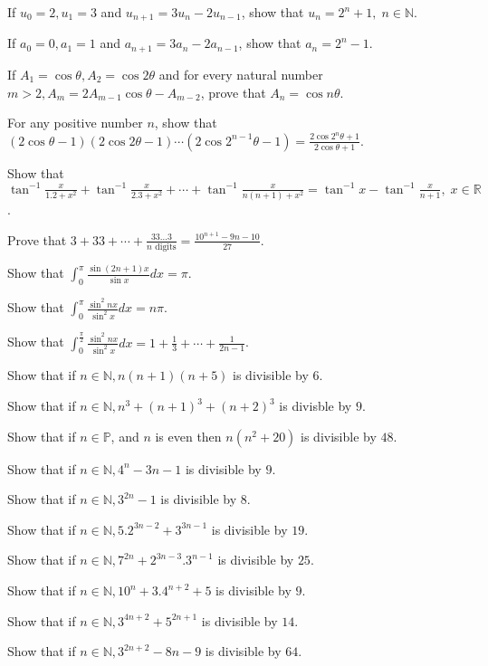 \item If $u_0 = 2, u_1 = 3$ and $u_{n + 1} = 3u_n - 2u_{n - 1}$, show that $u_n = 2^n + 1,\;n\in \mathbb{N}$.
\item If $a_0 = 0, a_1 = 1$ and $a_{n + 1} = 3a_n - 2a_{n - 1}$, show that $a_n = 2^n - 1$.
\item If $A_1 = \cos\theta, A_2 = \cos2\theta$ and for every natural number $m > 2, A_m = 2A_{m-1}\cos\theta - A_{m - 2}$, prove
  that $A_n = \cos n\theta$.
\item For any positive number $n$, show that $(2\cos\theta - 1)(2\cos2\theta - 1)\cdots(2\cos2^{n - 1}\theta - 1) =
  \frac{2\cos2^n\theta + 1}{2\cos\theta + 1}$.
\item Show that $\tan^{-1}\frac{x}{1.2 + x^2} + \tan^{-1}\frac{x}{2.3 + x^2} + \cdots + \tan^{-1}\frac{x}{n(n + 1) + x^2} =
  \tan^{-1}x - \tan^{-1}\frac{x}{n + 1},\;x\in \mathbb{R}$.
\item Prove that $3 + 33 + \cdots + \frac{33\ldots3}{n\text{~digits}} = \frac{10^{n + 1} - 9n - 10}{27}$.
\item Show that $\displaystyle\int_{0}^\pi\frac{\sin(2n + 1)x}{\sin x}dx = \pi$.
\item Show that $\displaystyle\int_{0}^\pi\frac{\sin^2nx}{\sin^2x}dx = n\pi$.
\item Show that $\displaystyle\int_{0}^{\frac{\pi}{2}}\frac{\sin^2nx}{\sin^2x}dx = 1 + \frac{1}{3} + \cdots + \frac{1}{2n - 1}$.
\item Show that if $n\in\mathbb{N}, n(n + 1)(n + 5)$ is divisible by $6$.
\item Show that if $n\in\mathbb{N}, n^3 + (n + 1)^3 + (n + 2)^3$ is divisble by $9$.
\item Show that if $n\in\mathbb{P}$, and $n$ is even then $n(n^2 + 20)$ is divisible by $48$.
\item Show that if $n\in\mathbb{N}, 4^n - 3n - 1$ is divisible by $9$.
\item Show that if $n\in\mathbb{N}, 3^{2n} - 1$ is divisible by $8$.
\item Show that if $n\in\mathbb{N}, 5.2^{3n - 2} + 3^{3n - 1}$ is divisible by $19$.
\item Show that if $n\in\mathbb{N}, 7^{2n} + 2^{3n - 3}.3^{n - 1}$ is divisible by $25$.
\item Show that if $n\in\mathbb{N}, 10^n + 3.4^{n + 2} + 5$ is divisible by $9$.
\item Show that if $n\in\mathbb{N}, 3^{4n + 2} + 5^{2n + 1}$ is divisible by $14$.
\item Show that if $n\in\mathbb{N}, 3^{2n + 2} - 8n - 9$ is divisible by $64$.
